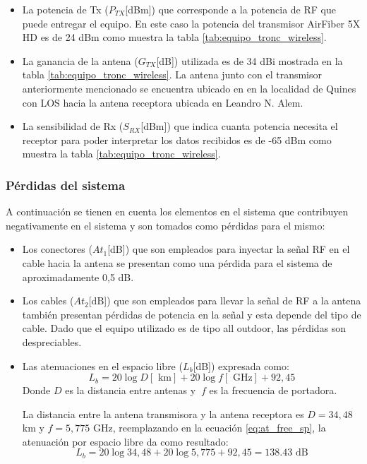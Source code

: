 \documentclass[11pt,a4paper]{article}
\begin{document}
\begin{itemize}
  \item  La potencia de Tx ($P_{TX}$[dBm]) que corresponde a la potencia de RF que puede entregar el equipo. En este caso la potencia del transmisor AirFiber 5X HD es de 24 dBm como muestra la tabla \ref{tab:equipo_tronc_wireless}. 

  \item  La ganancia de la antena  ($G_{TX}$[dB])  utilizada es de 34 dBi mostrada en la tabla \ref{tab:equipo_tronc_wireless}.  
  La antena junto con el transmisor anteriormente mencionado se encuentra ubicado en en la localidad de Quines con LOS hacia la antena receptora ubicada en Leandro N. Alem. 

  \item  La sensibilidad de Rx ($S_{RX}$[dBm]) que indica cuanta potencia necesita el receptor para poder interpretar los datos recibidos es de -65 dBm como muestra la tabla \ref{tab:equipo_tronc_wireless}.
\end{itemize}

\subsubsection{Pérdidas del sistema}

A continuación se tienen en cuenta los elementos en el sistema que contribuyen negativamente en el sistema y son tomados como pérdidas para el mismo: 

\begin{itemize}
  \item  Los conectores (${At}_1$[dB]) que son empleados para inyectar la señal RF en el cable hacia la antena se presentan como una pérdida para el sistema de aproximadamente 0,5 dB.

  \item  Los cables (${At}_2$[dB]) que son empleados para llevar la señal de RF a la antena también presentan pérdidas de potencia en la señal y esta depende del tipo de cable. Dado que el equipo utilizado es de tipo all outdoor, las pérdidas son despreciables.

  \item  Las atenuaciones en el espacio libre ($L_b$[dB]) expresada como:
  \begin{equation}
    L_b=20\log{D} [\text{ km}]+20\log{f} [\text{ GHz}]+92,45
    \label{eq:at_free_sp}
  \end{equation}
  Donde $D$ es la distancia entre antenas y $\ f$ es la frecuencia de portadora. 

  La distancia entre la antena transmisora y la antena receptora es $D=34,48$ km y $f=5,775$ GHz, reemplazando en la ecuación \ref{eq:at_free_sp}, la atenuación por espacio libre da como resultado:
  \begin{equation*}
    L_b=20\log{34,48}+20\log{5,775}+92,45=138.43 \text{ dB} 
  \end{equation*}
  

\end{itemize}
\end{document}
